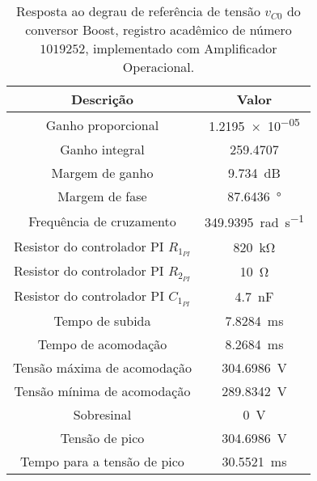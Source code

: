 \begin{table}[!ht]
\centering
\caption{Resposta ao degrau de referência de tensão $v_{C0}$ do conversor Boost, registro acadêmico de número $1019252$, implementado com Amplificador Operacional.}
\label{tab:resposta1malhaAmpOp}
\begin{tabular}{@{}cc@{}}
\toprule
\textbf{Descrição} & \textbf{Valor}\\ \midrule
Ganho proporcional & \SI{1.2195e-05}{}\\
Ganho integral & \SI{259.4707}{}\\
Margem de ganho & \SI{9.734}{\deci\bel}\\
Margem de fase & \SI{87.6436}{\degree}\\
Frequência de cruzamento & \SI{349.9395}{\radian\per\s}\\
Resistor do controlador PI $R_{1_{PI}}$ & \SI{820}{\kilo\ohm}\\
Resistor do controlador PI $R_{2_{PI}}$ & \SI{10}{\ohm}\\
Resistor do controlador PI $C_{1_{PI}}$ & \SI{4.7}{\nano\F}\\
Tempo de subida & \SI{7.8284}{\milli\s}\\
Tempo de acomodação & \SI{8.2684}{\milli\s}\\
Tensão máxima de acomodação & \SI{304.6986}{\V}\\
Tensão mínima de acomodação & \SI{289.8342}{\V}\\
Sobresinal & \SI{0}{\V}\\
Tensão de pico & \SI{304.6986}{\V}\\
Tempo para a tensão de pico & \SI{30.5521}{\milli\s}\\
\bottomrule
\end{tabular}
\end{table}

